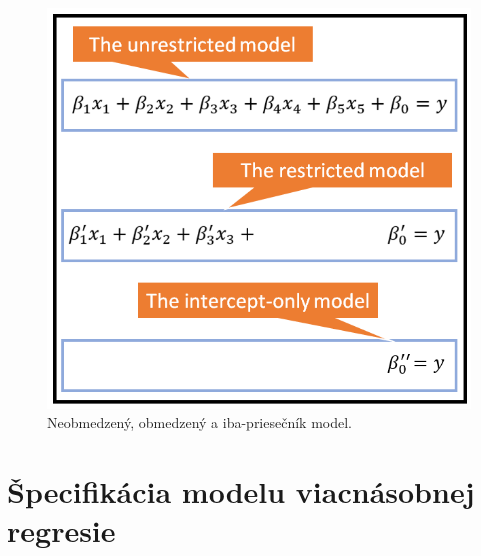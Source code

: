 \documentclass[]{tukediphc}
\begin{document}
\begin{figure}[!ht] 
    \centering 
    \includegraphics[scale = 0.5]{diplomka obrazky/15.png} 
    \caption{Neobmedzený, obmedzený a iba-priesečník model.} 
\end{figure} 

\newpage
\section{Špecifikácia modelu viacnásobnej regresie}
\end{document}
